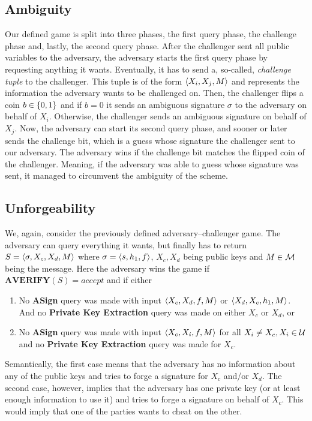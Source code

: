 \subsection{Ambiguity}
  Our defined game is split into three phases, the first query phase, the challenge phase and, lastly, the second query phase. 
  After the challenger sent all public variables to the adversary, the adversary starts the first query phase by requesting anything it wants.
  Eventually, it has to send a, so-called, \textit{challenge tuple} to the challenger.
  This tuple is of the form \(\langle X_i, X_j, M \rangle\) and represents the information the adversary wants to be challenged on.
  Then, the challenger flips a coin \(b\in \{ 0,1 \}\) and if \(b = 0\) it sends an ambiguous signature \(\sigma\) to the adversary on behalf of \(X_i\).
  Otherwise, the challenger sends an ambiguous signature on behalf of \(X_j\). 
  Now, the adversary can start its second query phase, and sooner or later sends the challenge bit, which is a guess whose signature the challenger sent to our adversary.
  The adversary wins if the challenge bit matches the flipped coin of the challenger.
  Meaning, if the adversary was able to guess whose signature was sent, it managed to circumvent the ambiguity of the scheme.

\subsection{Unforgeability}\label{unforgeability}
  We, again, consider the previously defined adversary--challenger game.
  The adversary can query everything it wants, but finally has to return \(S=\langle \sigma, X_c, X_d, M \rangle\) where \(\sigma=\langle s, h_1, f \rangle\), \(X_c, X_d\) being public keys and \(M\in\mathcal{M}\) being the message.
  Here the adversary wins the game if \(\textbf{AVERIFY}(S) = accept\) and if either
    \begin{enumerate}
      \item No \textbf{ASign} query was made with input \(\langle X_c, X_d, f, M \rangle\) or \(\langle X_d, X_c, h_1, M \rangle\).
            And no \textbf{Private Key Extraction} query was made on either \(X_c\) or \(X_d\), or
      \item No \textbf{ASign} query was made with input \(\langle X_c, X_i, f, M \rangle\) for all \(X_i \neq X_c, X_i\in\mathcal{U}\) and no \textbf{Private Key Extraction} query was made for \(X_c\).
    \end{enumerate}
  Semantically, the first case means that the adversary has no information about any of the public keys and tries to forge a signature for \(X_c\) and/or \(X_d\).
  The second case, however, implies that the adversary has one private key (or at least enough information to use it) and tries to forge a signature on behalf of \(X_c\).
  This would imply that one of the parties wants to cheat on the other.

